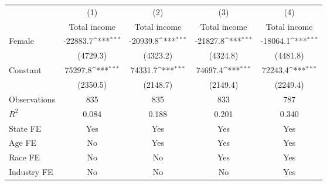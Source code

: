 {
\def\sym#1{\ifmmode^{#1}\else\(^{#1}\)\fi}
\begin{tabular}{l*{4}{c}}
\toprule
                    &\multicolumn{1}{c}{(1)}&\multicolumn{1}{c}{(2)}&\multicolumn{1}{c}{(3)}&\multicolumn{1}{c}{(4)}\\
                    &\multicolumn{1}{c}{Total income}&\multicolumn{1}{c}{Total income}&\multicolumn{1}{c}{Total income}&\multicolumn{1}{c}{Total income}\\
\midrule
Female              &    -22883.7\sym{***}&    -20939.8\sym{***}&    -21827.8\sym{***}&    -18064.1\sym{***}\\
                    &    (4729.3)         &    (4323.2)         &    (4324.8)         &    (4481.8)         \\
\addlinespace
Constant            &     75297.8\sym{***}&     74331.7\sym{***}&     74697.4\sym{***}&     72243.4\sym{***}\\
                    &    (2350.5)         &    (2148.7)         &    (2149.4)         &    (2249.4)         \\
\midrule
Observations        &         835         &         835         &         833         &         787         \\
\(R^{2}\)           &       0.084         &       0.188         &       0.201         &       0.340         \\
State FE            &         Yes         &         Yes         &         Yes         &         Yes         \\
Age FE              &          No         &         Yes         &         Yes         &         Yes         \\
Race FE             &          No         &          No         &         Yes         &         Yes         \\
Industry FE         &          No         &          No         &          No         &         Yes         \\
\bottomrule
\end{tabular}
}
